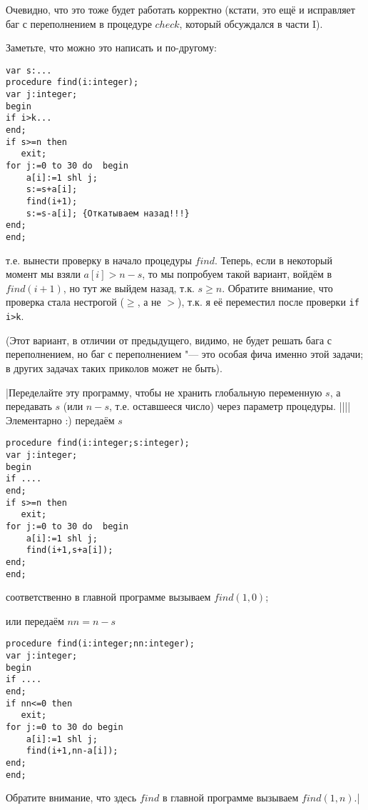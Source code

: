 Очевидно, что это тоже будет работать корректно (кстати, это ещё и исправляет баг с 
переполнением в процедуре $check$, который обсуждался в части I). 

Заметьте, что можно это написать и по-другому:

\begin{codesampleo}\begin{verbatim}
var s:...
procedure find(i:integer);
var j:integer;
begin
if i>k...
end;
if s>=n then
   exit;
for j:=0 to 30 do  begin
    a[i]:=1 shl j;
    s:=s+a[i];
    find(i+1);
    s:=s-a[i]; {Откатываем назад!!!}
end;
end;
\end{verbatim}
\end{codesampleo}

т.е. вынести проверку в начало процедуры $find$. Теперь, если в некоторый момент мы взяли 
$a[i]>n-s$, то мы попробуем такой вариант, войдём в $find(i+1)$, но тут же выйдем назад, т.к. $s\geq n$. Обратите внимание, что проверка стала нестрогой ($\geq$, а не $>$), т.к. я её переместил после проверки \texttt{if i>k}.

(Этот вариант, в отличии от предыдущего, видимо, не будет решать бага с переполнением, но баг с переполнением "--- это особая фича именно этой задачи; в других задачах таких приколов может не быть).

\task|Переделайте эту программу, чтобы не хранить глобальную переменную $s$, а передавать $s$ (или $n-s$, т.е. оставшееся число) через параметр процедуры.
||||Элементарно :) передаём $s$
\begin{codesampleo}\begin{verbatim}
procedure find(i:integer;s:integer);
var j:integer;
begin
if ....
end;
if s>=n then
   exit;
for j:=0 to 30 do  begin
    a[i]:=1 shl j;
    find(i+1,s+a[i]);
end;
end;
\end{verbatim}
\end{codesampleo}

соответственно в главной программе вызываем $find(1,0)$;

или передаём $nn=n-s$

\begin{codesampleo}\begin{verbatim}
procedure find(i:integer;nn:integer);
var j:integer;
begin
if ....
end;
if nn<=0 then
   exit;
for j:=0 to 30 do begin
    a[i]:=1 shl j;
    find(i+1,nn-a[i]);
end;
end;
\end{verbatim}
\end{codesampleo}

Обратите внимание, что здесь $find$ в главной программе вызываем $find(1,n)$.|

